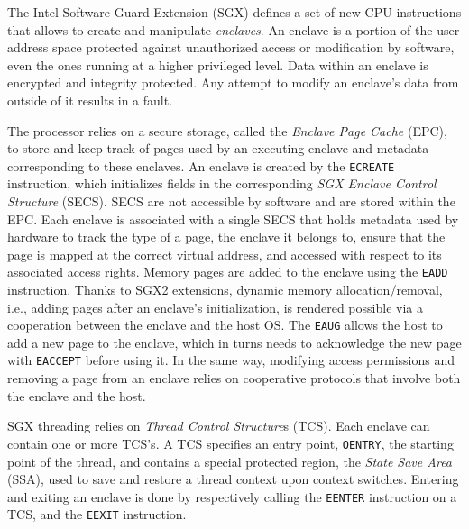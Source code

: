 The Intel Software Guard Extension (SGX) defines a set of new CPU instructions that allows to create and manipulate \emph{enclaves}.
An enclave is a portion of the user address space protected against unauthorized access or modification by software, even the ones running at a higher privileged level.
Data within an enclave is encrypted and integrity protected.
Any attempt to modify an enclave's data from outside of it results in a fault.

The processor relies on a secure storage, called the \emph{Enclave Page Cache} (EPC), to store and keep track of pages used by an executing enclave and metadata corresponding to these enclaves.
An enclave is created by the \lstinline{ECREATE} instruction, which initializes fields in the corresponding \emph{SGX Enclave Control Structure} (SECS).
SECS are not accessible by software and are stored within the EPC.
Each enclave is associated with a single SECS that holds metadata used by hardware to track the type of a page, the enclave it belongs to, ensure that the page is mapped at the correct virtual address, and accessed with respect to its associated access rights.
Memory pages are added to the enclave using the \lstinline{EADD} instruction.
Thanks to SGX2 extensions, dynamic memory allocation/removal, i.e., adding pages after an enclave's initialization, is rendered possible via a cooperation between the enclave and the host OS.
The \lstinline{EAUG} allows the host to add a new page to the enclave, which in turns needs to acknowledge the new page with \lstinline{EACCEPT} before using it.
In the same way, modifying access permissions and removing a page from an enclave relies on cooperative protocols that involve both the enclave and the host.

SGX threading relies on \emph{Thread Control Structure}s (TCS).
Each enclave can contain one or more TCS's.
A TCS specifies an entry point, \lstinline{OENTRY}, the starting point of the thread, and contains a special protected region, the \emph{State Save Area} (SSA), used to save and restore a thread context upon context switches.
Entering and exiting an enclave is done by respectively calling the \lstinline{EENTER} instruction on a TCS, and the \lstinline{EEXIT} instruction.


